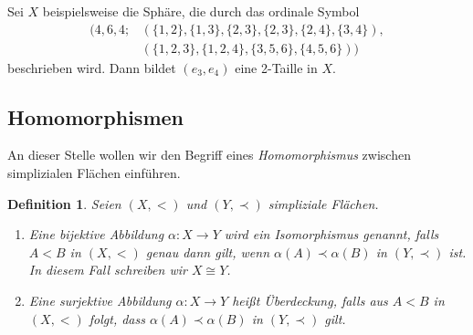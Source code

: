 \documentclass[12pt,titlepage,twoside,cleardoublepage]{article}
\theoremstyle{nummermitklammern}
\newtheorem{definition}[temp]{Definition}
\newtheorem{definition}[zahl]{Definition}
\numberwithin{equation}{section}
\begin{document}
Sei $X$ beispielsweise die Sphäre, die durch das ordinale Symbol
\begin{align*}
(4,6,4;&(\{1,2\},\{1,3\},\{2,3\},\{2,3\},\{2,4\},\{3,4\}),\\&(\{1,2,3\},\{1,2,4\},\{3,5,6\},\{4,5,6\}))
\end{align*}
beschrieben wird. Dann bildet $(e_3,e_4)$ eine 2-Taille in $X$.

\subsection{Homomorphismen}
An dieser Stelle wollen wir den Begriff eines \emph{Homomorphismus} zwischen simplizialen Flächen einführen.
\begin{definition} Seien $(X,<)$ und $(Y,\prec)$ simpliziale Flächen.
\begin{enumerate}
 \item Eine bijektive Abbildung $\alpha: X \to Y$ wird ein \emph{Isomorphismus} genannt, falls $A<B$ in $(X,<)$ genau dann gilt, wenn $\alpha(A) \prec \alpha(B)$ in $(Y,\prec)$  ist. In diesem Fall schreiben wir $X \cong Y$.
\item Eine surjektive Abbildung $\alpha: X \to Y$ heißt \emph{Überdeckung}, falls aus $A<B$ in $(X,<)$ folgt, dass $\alpha(A) \prec \alpha(B)$ in $(Y,\prec)$ gilt. 
\end{enumerate}
\end{definition}
\end{document}

